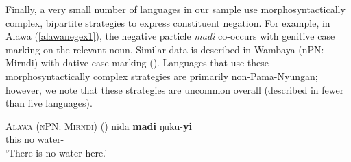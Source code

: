\documentclass[12pt,egregdoesnotlikesansseriftitles]{scrartcl}
\begin{document}
Finally, a very small number of languages in our sample use morphosyntactically complex, bipartite strategies to express constituent negation. For example, in Alawa (\ref{alawanegex1}),  the negative particle \textit{madi} co-occurs with genitive case marking on the relevant noun. Similar data is described in Wambaya (nPN: Mirndi) with dative case marking (\citealt[204]{nordlinger98}). Languages that use these morphosyntactically complex strategies are primarily non-Pama-Nyungan; however, we note that these strategies are uncommon overall (described in fewer than five languages).
 

\begin{exe}
  \ex \textsc{Alawa (nPN: Mirndi)} \hfill (\citealt[63]{sharpe72})
  \gll nida \textbf{madi} ŋuku-\textbf{yi}\\
  this  no  water-\Gen\\
  \glt `There is no water here.' \label{alawanegex1}
\end{exe}
 
\end{document}
